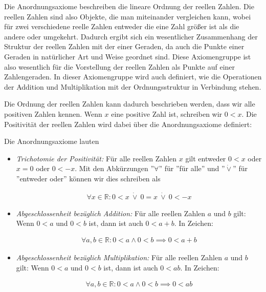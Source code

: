 \documentclass[fontsize=9pt,
               parskip=half-,
               DIV=14,
               listof=chapterentry,
               tocflat]{scrbook}
\begin{document}
Die Anordnungsaxiome beschreiben die lineare Ordnung der reellen Zahlen. Die reellen Zahlen sind also Objekte, die man miteinander vergleichen kann, wobei für zwei verschiedene reelle Zahlen entweder die eine Zahl größer ist als die andere oder umgekehrt. Dadurch ergibt sich ein wesentlicher Zusammenhang der Struktur der reellen Zahlen mit der einer Geraden, da auch die Punkte einer Geraden in natürlicher Art und Weise geordnet sind. Diese Axiomengruppe ist also wesentlich für die Vorstellung der reellen Zahlen als Punkte auf einer Zahlengeraden. In dieser Axiomengruppe wird auch definiert, wie die Operationen der Addition und Multiplikation mit der Ordnungsstruktur in Verbindung stehen.

Die Ordnung der reellen Zahlen kann dadurch beschrieben werden, dass wir alle positiven Zahlen kennen. Wenn $x$ eine positive Zahl ist, schreiben wir $0<x$. Die Positivität der reellen Zahlen wird dabei über die Anordnungsaxiome definiert:

\begin{definition*}[Anordnungsaxiome]
Die Anordnungsaxiome lauten

\begin{itemize}
\item \emph{Trichotomie der Positivität:} Für alle reellen Zahlen $x$ gilt entweder $0<x$ oder $x=0$ oder $0<-x$. Mit den Abkürzungen {''}$\forall ${''} für {''}für alle{''} und {''}${\dot {\lor }}${''} für {''}entweder oder{''} können wir dies schreiben als

\begin{align*}
\forall x\in \mathbb {R} :0<x\ {\dot {\lor }}\ 0=x\ {\dot {\lor }}\ 0<-x
\end{align*}


\item \emph{Abgeschlossenheit bezüglich Addition:} Für alle reellen Zahlen $a$ und $b$ gilt: Wenn $0<a$ und $0<b$ ist, dann ist auch $0<a+b$. In Zeichen:

\begin{align*}
\forall a,b\in \mathbb {R} :0<a\land 0<b\implies 0<a+b
\end{align*}


\item \emph{Abgeschlossenheit bezüglich Multiplikation:} Für alle reellen Zahlen $a$ und $b$ gilt: Wenn $0<a$ und $0<b$ ist, dann ist auch $0<ab$. In Zeichen:

\begin{align*}
\forall a,b\in \mathbb {R} :0<a\land 0<b\implies 0<ab
\end{align*}


\end{itemize}

\end{definition*}
\end{document}
